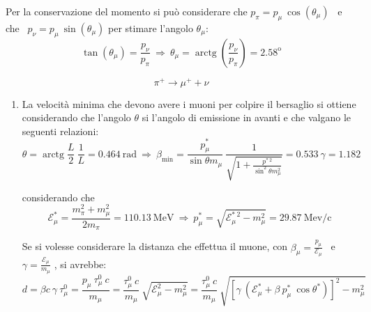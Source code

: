 \documentclass[12pt,twoside,a4]{article}
\DeclareMathOperator{\arctg}{arctg}
\begin{document}
\begin{solution}
\begin{enumerate}[label=(\textit{\roman*})]
Per la conservazione del momento si può considerare che $p_\pi = p_\mu \ \cos{(\theta_\mu)}$ \ e che \ $ p_\nu = p_\mu \ \sin{(\theta_\mu)}$ per stimare l'angolo $\theta_\mu$: 
\begin{equation*}
    \tan{(\theta_\mu)} = \frac{p_\nu}{p_\pi}  \  \Rightarrow  \  \theta_\mu = \arctg{\left( \frac{p_\nu}{p_\pi}\right)} = 2.58^{\mathrm{o}} 
\end{equation*}
\end{enumerate}
\end{solution}





\begin{solution}
\begin{equation}\label{eq: dec5.6}
    \pi^+ \rightarrow \mu^+ + \nu 
\end{equation}

\begin{enumerate}[label=(\textit{\roman*})]
	\item La velocità minima che devono avere i muoni per colpire il bersaglio si ottiene considerando che l'angolo $\theta$ si l'angolo di emissione in avanti e che valgano le seguenti relazioni: \begin{equation*}
 \theta = \arctg{\frac{L}{2} \ \frac{1}{L}} = 0.464 \ \mathrm{rad}  \  \Rightarrow  \  \beta_{\mathrm{min}} = \frac{p^\ast_\mu}{\sin{\theta} m_\mu} \ \frac{1}{\sqrt{1 + \frac{p^{\ast \ 2}}{\sin^2{\theta} m^2_\mu}}} = 0.533  \  \gamma = 1.182   
\end{equation*} 

considerando che \begin{equation*}
\mathcal{E}^\ast_\mu = \frac{m^2_\pi + m^2_\mu}{2 m_\pi} = 110.13 \ \mathrm{MeV}     \  \Rightarrow  \  p^\ast_\mu = \sqrt{\mathcal{E}^{\ast \ 2 }_\mu - m^2_\mu} =  29.87 \ \mathrm{Mev/c}  
\end{equation*}

\bigskip
Se si volesse considerare la distanza che effettua il muone, con $\beta_\mu = \frac{p_\mu}{\mathcal{E}_\mu}$ \ e \ $\gamma = \frac{\mathcal{E}_\mu}{m_\mu}$ , si avrebbe: \begin{equation*}
d = \beta c \ \gamma \ \tau^0_\mu  = \frac{p_\mu \ \tau^0_\mu \ c}{m_\mu}  = \frac{ \tau^0_\mu \ c}{m_\mu} \ \sqrt{\mathcal{E}^{2}_\mu - m^2_\mu} = \frac{ \tau^0_\mu \ c}{m_\mu} \ \sqrt{[\gamma \ (\mathcal{E}^\ast_\mu + \beta \ p^\ast_\mu \ \cos{\theta^\ast})]^{2} - m^2_\mu}  
\end{equation*}


\end{enumerate}
\end{solution}
\end{document}
